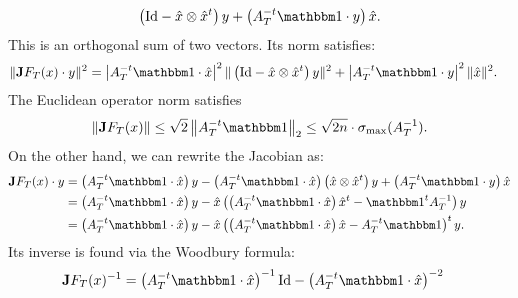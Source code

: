 \documentclass[10pt,a4paper]{article}
\begin{document}
\begin{itemize}
\begin{align*}
            \left( \Id - \hat x \otimes \hat x^t \right) y
            + 
            \left( A_{T}^{-t} \vecone \cdot y \right) \hat x 
            .
        \end{align*}
        This is an orthogonal sum of two vectors. Its norm satisfies:
        \begin{align*}
            \| \Jacobian F_T(x) \cdot y \|^{2}
            &= 
            \left| A_{T}^{-t} \vecone \cdot \hat x \right|^{2}
            \| \left( \Id - \hat x \otimes \hat x^t \right) y \|^{2}
            + 
            \left| A_{T}^{-t} \vecone \cdot y \right|^{2} \| \hat x \|^{2}
            .
        \end{align*}
        The Euclidean operator norm satisfies 
        \begin{align*}
            \| \Jacobian F_T(x) \| 
            \leq 
            \sqrt 2 \left\| A_{T}^{-t} \vecone \right\|_{2}
            \leq 
            \sqrt{2n} \cdot \sigma_{\max}(A_{T}^{-1}) 
            .
        \end{align*}
        On the other hand, we can rewrite the Jacobian as:
        \begin{align*}
            \Jacobian F_T(x) \cdot y
            &= 
            \left( A_{T}^{-t} \vecone \cdot \hat x \right)
            y
            - 
            \left( A_{T}^{-t} \vecone \cdot \hat x \right)
            \left( \hat x \otimes \hat x^t \right) y
            + 
            \left( A_{T}^{-t} \vecone \cdot y \right) \hat x 
            \\&= 
            \left( A_{T}^{-t} \vecone \cdot \hat x \right)
            y
            - 
            \hat x 
            \left( 
                \left( A_{T}^{-t} \vecone \cdot \hat x \right) \hat x^{t}
                -
                \vecone^{t} A_{T}^{-1} 
            \right) y
            \\&= 
            \left( A_{T}^{-t} \vecone \cdot \hat x \right)
            y
            - 
            \hat x 
            \left( 
                \left( A_{T}^{-t} \vecone \cdot \hat x \right) \hat x
                -
                A_{T}^{-t} \vecone
            \right)^{t} y
            .
        \end{align*}
        Its inverse is found via the Woodbury formula: 
        \begin{align*}
            \Jacobian F_T(x)^{-1}
            &= 
            \left( A_{T}^{-t} \vecone \cdot \hat x \right)^{-1}
            \Id
            - 
            \left( A_{T}^{-t} \vecone \cdot \hat x \right)^{-2}

\end{align*}
\end{itemize}
\end{document}
